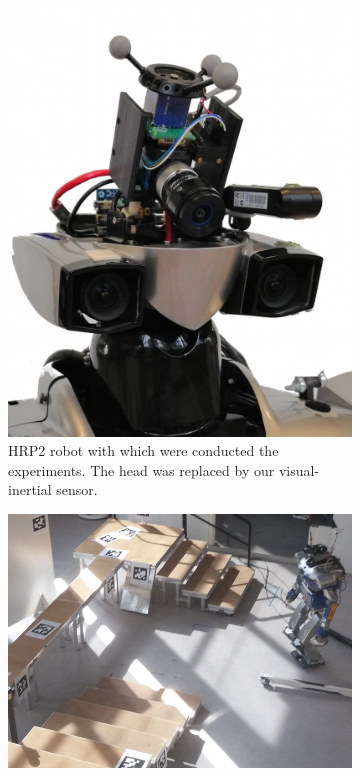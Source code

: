 \begin{figure}[h]
    \centering
    \begin{subfigure}{0.384\textwidth}
        \includegraphics[width=\textwidth]{figures/absolute/HPR2_head_crop.png}
        \caption{HRP2 robot with which were conducted the experiments. The head was replaced by our visual-inertial sensor.}
        \label{fig:HPR2_head_crop}
    \end{subfigure}
    \hfill
    \begin{subfigure}{0.546\textwidth}
        \includegraphics[width=\textwidth]{figures/absolute/bauzil.png}

\end{subfigure}
\end{figure}
